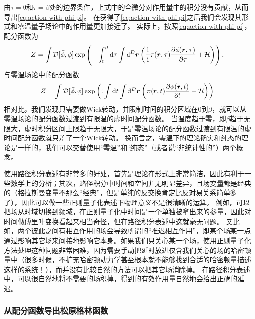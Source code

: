 \documentclass[hyperref, UTF8, a4paper]{ctexart}
\newcommand*{\ii}{\mathrm{i}}
\newcommand*{\fd}[1]{\mathcal{D}{#1}}
\begin{document}
由$\tau=0$和$\tau=\beta$处的边界条件，上式中的全微分对作用量中的积分没有贡献，从而导出\eqref{eq:action-with-phi-pi}。
在获得了\eqref{eq:action-with-phi-pi}之后我们会发现其形式和零温量子场论中的作用量更加接近了。
实际上，按照\eqref{eq:action-with-phi-pi}，配分函数为
\[
    Z = \int \fd{[\bar{\phi}, \phi]} \exp \left( - \int_0^\beta \dd{\tau} \int \dd[D]{\vb*{r}} \left( \frac{1}{\ii} \pi(\vb*{r}, \tau) \pdv{\phi(\vb*{r}, \tau)}{\tau} + \mathcal{H} \right) \right),
\]
与零温场论中的配分函数
\[
    Z = \int \fd{[\bar{\phi}, \phi]} \exp \left( \ii \int \dd{t} \int \dd[D]{\vb*{r}} \left( \pi(\vb*{r}, t) \pdv{\phi(\vb*{r}, t)}{t} - \mathcal{H} \right) \right)
\]
相对比，我们发现只需要做Wick转动，并限制时间的积分区域在$0$到$\beta$，就可以从零温场论的配分函数过渡到有限温的虚时间配分函数。
当温度趋于零，即$\beta$趋于无限大，虚时积分区间上限趋于无限大，于是零温场论的配分函数过渡到有限温的虚时间配分函数就只差了一个Wick转动。
换而言之，零温下的理论确实和纯态的理论是一样的，我们可以交替使用“零温”和“纯态”（或者说“非统计性的”）两个概念。

使用路径积分表述有非常多的好处，首先是理论在形式上非常简洁，因此有利于一些数学上的分析；其次，路径积分中时间和空间并无明显差异，且场变量都是经典的（格拉斯曼变量不那么“经典”，但是单纯的反交换肯定比反对易关系简单多了），因此可以做一些正则量子化表述下物理意义不是很清晰的运算。
例如，可以把场从时域切换到频域，在正则量子化中时间是一个单独被拿出来的参量，因此对时间做傅里叶变换看起来相当奇怪，但在路径积分表述中这就毫无问题。
又比如，两个彼此之间有相互作用的场会导致所谓的“推迟相互作用”，即某个场某一点通过影响其它场来间接地影响它本身。如果我们只关心某一个场，使用正则量子化方法处理这种问题非常困难，因为需要手动把延时放进仅含我们关心的场的哈密顿量中（很多时候，不扩充哈密顿动力学甚至根本就不能够找到合适的哈密顿量描述这样的系统！），而并没有比较自然的方法可以把其它场消除掉。
在路径积分表述中，可以很自然地将不需要的场积掉，得到的有效作用量自然地会给出正确的延迟。


\subsubsection{从配分函数导出松原格林函数}
\end{document}
